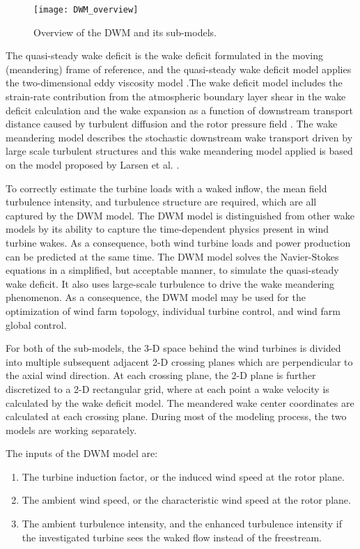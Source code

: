 \documentclass{umthesis}
\begin{document}
\begin{figure}
  \centering
  \texttt{[image: DWM\_overview]}
  \caption{Overview of the DWM and its sub-models.}\label{fig:DWM_overview}
\end{figure}

The quasi-steady wake deficit is the wake deficit formulated in the moving (meandering) frame of reference, and the quasi-steady wake deficit model applies the two-dimensional eddy viscosity model \cite{Keck_mixing}.The wake deficit model includes the strain-rate contribution from the atmospheric boundary layer shear in the wake deficit calculation and the wake expansion as a function of downstream transport distance caused by turbulent diffusion and the rotor pressure field \cite{Keck_two}. The wake meandering model describes the stochastic downstream wake transport driven by large scale turbulent structures and this wake meandering model applied is based on the model proposed by Larsen et al. \cite{Larsen_meandering}.

To correctly estimate the turbine loads with a waked inflow, the mean field turbulence intensity, and turbulence structure are required, which are all captured by the DWM model. The DWM model is distinguished from other wake models by its ability to capture the time-dependent physics present in wind turbine wakes. As a consequence, both wind turbine loads and power production can be predicted at the same time. The DWM model solves the Navier-Stokes equations in a simplified, but acceptable manner, to simulate the quasi-steady wake deficit. It also uses large-scale turbulence to drive the wake meandering phenomenon. As a consequence, the DWM model may be used for the optimization of wind farm topology, individual turbine control, and wind farm global control.

For both of the sub-models, the 3-D space behind the wind turbines is divided into multiple subsequent adjacent 2-D crossing planes which are perpendicular to the axial wind direction. At each crossing plane, the 2-D plane is further discretized to a 2-D rectangular grid, where at each point a wake velocity is calculated by the wake deficit model. The meandered wake center coordinates are calculated at each crossing plane. During most of the modeling process, the two models are working separately.

The inputs of the DWM model are:
\begin{enumerate}
  \item The turbine induction factor, or the induced wind speed at the rotor plane.
  \item The ambient wind speed, or the characteristic wind speed at the rotor plane.
  \item The ambient turbulence intensity, and the enhanced turbulence intensity if the investigated turbine sees the waked flow instead of the freestream.
\end{enumerate}
\end{document}
